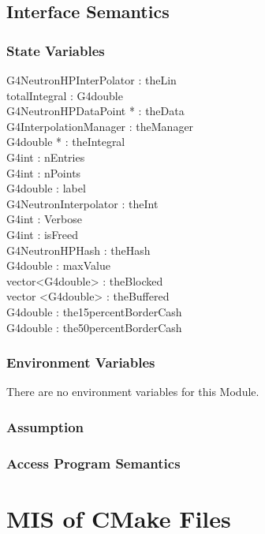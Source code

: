\documentclass[12pt]{article}
\begin{document}
\subsection{Interface Semantics} 

\subsubsection{State Variables}%
G4NeutronHPInterPolator : theLin\\
totalIntegral : G4double\\
G4NeutronHPDataPoint * : theData\\
G4InterpolationManager : theManager\\
G4double * : theIntegral\\
G4int : nEntries\\
G4int : nPoints\\
G4double : label\\
G4NeutronInterpolator : theInt\\
G4int : Verbose\\
G4int : isFreed\\
G4NeutronHPHash : theHash\\
G4double : maxValue\\
vector<G4double> : theBlocked\\
vector <G4double> : theBuffered\\
G4double : the15percentBorderCash\\
G4double : the50percentBorderCash


\subsubsection{Environment Variables}%
There are no environment variables for this Module.

\subsubsection{Assumption}%

\subsubsection{Access Program Semantics}%

\section{MIS of CMake Files}
\end{document}

